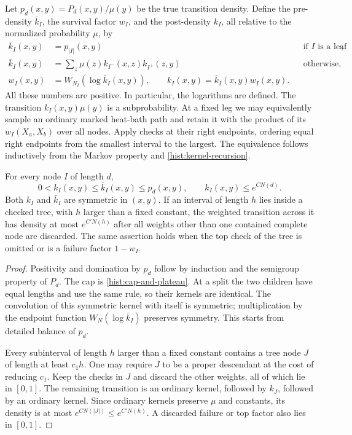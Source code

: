 Let $p_d(x,y)=P_d(x,y)/\mu(y)$ be the true transition density.  Define
the pre-density $\bar k_I$, the survival factor $w_I$, and the post-density
$k_I$, all relative to the normalized probability $\mu$, by
\begin{equation}\label{hist:kernel-recursion}
 \begin{aligned}
 \bar k_I(x,y)&=p_{|I|}(x,y) &&\text{if $I$ is a leaf},\\
 \bar k_I(x,y)&=\sum_z\mu(z)k_{I^-}(x,z)k_{I^+}(z,y)
                                      &&\text{otherwise},\\
 w_I(x,y)&=W_{N_I}(\log\bar k_I(x,y)),\qquad
 k_I(x,y)=\bar k_I(x,y)w_I(x,y).
 \end{aligned}
\end{equation}
All these numbers are positive.  In particular, the logarithms are defined.
The transition $k_I(x,y)\mu(y)$ is a subprobability.  At a fixed leg we
may equivalently sample an ordinary marked heat-bath path and retain it with
the product of its $w_I(X_a,X_b)$ over all nodes.  Apply checks at their
right endpoints, ordering equal right endpoints from the smallest interval
to the largest.  The equivalence follows inductively from the Markov
property and \eqref{hist:kernel-recursion}.

\begin{lemma}\label{hist:kernel-caps}
For every node $I$ of length $d$,
\begin{equation}\label{hist:kernel-bounds}
 0<k_I(x,y)\le\bar k_I(x,y)\le p_d(x,y),\qquad k_I(x,y)\le e^{CN(d)}.
\end{equation}
Both $k_I$ and $\bar k_I$ are symmetric in $(x,y)$.  If an interval of
length $h$ lies inside a checked tree, with $h$ larger than a fixed constant,
the weighted transition across it has density at most $e^{C'N(h)}$ after
all weights other than one contained complete node are discarded.  The same
assertion holds when the top check of the tree is omitted or is a failure
factor $1-w_I$.
\end{lemma}

\begin{proof}
Positivity and domination by $p_d$ follow by induction and the semigroup
property of $P_d$.  The cap is \eqref{hist:cap-and-plateau}.  At a split the
two children have equal lengths and use the same rule, so their kernels are
identical.  The convolution of this symmetric kernel with itself is
symmetric; multiplication by the endpoint function $W_N(\log\bar k_I)$
preserves symmetry.  This starts from detailed balance of $p_d$.

Every subinterval of length $h$ larger than a fixed constant contains a
tree node $J$ of length at least $c_1h$.  One may require $J$ to be a proper
descendant at the cost of reducing $c_1$.  Keep the checks in $J$ and discard
the other weights, all of which lie in $[0,1]$.  The remaining transition
is an ordinary kernel, followed by $k_J$, followed by an ordinary kernel.
Since ordinary kernels preserve $\mu$ and constants, its density is at most
$e^{CN(|J|)}\le e^{C'N(h)}$.  A discarded failure or top factor also lies
in $[0,1]$.
\end{proof}

